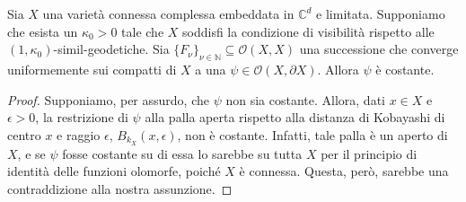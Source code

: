\begin{thm} \label{lim_is_const}
    Sia $X$ una varietà connessa complessa embeddata in $\mathbb{C}^d$ e limitata. Supponiamo che esista un $\kappa_0>0$ tale che $X$ soddisfi la condizione di visibilità rispetto alle $(1,\kappa_0)$-simil-geodetiche. Sia $\{F_\nu\}_{\nu\in\mathbb{N}} \subseteq \mathcal{O}(X,X)$  una successione che converge uniformemente sui compatti di $X$ a una $\psi\in\mathcal{O}(X,\partial X)$. Allora $\psi$ è costante.
\end{thm}

\begin{proof}
    Supponiamo, per assurdo, che $\psi$ non sia costante. Allora, dati $x \in X$ e $\epsilon>0$, la restrizione di $\psi$ alla palla aperta rispetto alla distanza di Kobayashi di centro $x$ e raggio $\epsilon$, $B_{k_X}(x,\epsilon)$, non è costante. Infatti, tale palla è un aperto di $X$, e se $\psi$ fosse costante su di essa lo sarebbe su tutta $X$ per il principio di identità delle funzioni olomorfe, poiché $X$ è connessa. Questa, però, sarebbe una contraddizione alla nostra assunzione.


\end{proof}
